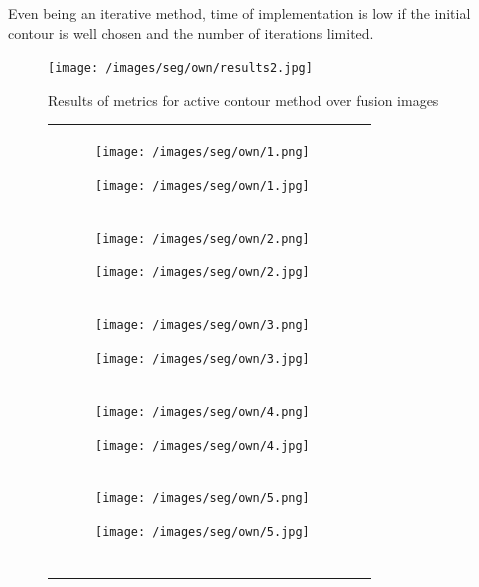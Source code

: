 \documentclass[a4paper, 10pt, conference]{ieeeconf}        %
\begin{document}
Even being an iterative method, time of implementation is low if the initial contour is well chosen and the number of iterations limited.
 \begin{figure}[ht!]
 \centering
  \texttt{[image: /images/seg/own/results2.jpg]}
  \caption{Results of metrics for active contour method over fusion images}
 \end{figure}
\begin{figure}[ht!]
 \centering
 \begin{tabular}{c c}
 \begin{subfigure}{0.2\textwidth}
 \texttt{[image: /images/seg/own/1.png]}\caption{}
 \end{subfigure}
 \begin{subfigure}{0.2\textwidth}
 \texttt{[image: /images/seg/own/1.jpg]}\caption{}
 \end{subfigure}\\
 \begin{subfigure}{0.2\textwidth}
  \texttt{[image: /images/seg/own/2.png]}\caption{}
  \end{subfigure}
  \begin{subfigure}{0.2\textwidth}
  \texttt{[image: /images/seg/own/2.jpg]}\caption{}
  \end{subfigure}\\
 \begin{subfigure}{0.2\textwidth}
  \texttt{[image: /images/seg/own/3.png]}\caption{}
  \end{subfigure}
  \begin{subfigure}{0.2\textwidth}
  \texttt{[image: /images/seg/own/3.jpg]}\caption{}
  \end{subfigure}\\
 \begin{subfigure}{0.2\textwidth}
  \texttt{[image: /images/seg/own/4.png]}\caption{}
  \end{subfigure}
  \begin{subfigure}{0.2\textwidth}
  \texttt{[image: /images/seg/own/4.jpg]}\caption{}
  \end{subfigure}\\
 \begin{subfigure}{0.2\textwidth}
 \texttt{[image: /images/seg/own/5.png]}\caption{}
 \end{subfigure}
 \begin{subfigure}{0.2\textwidth}
 \texttt{[image: /images/seg/own/5.jpg]}\caption{}
 \end{subfigure}\\
 \begin{subfigure}{0.2\textwidth}

\end{subfigure}
\end{tabular}
\end{figure}
\end{document}
